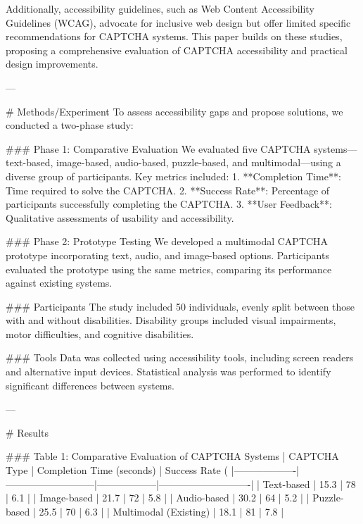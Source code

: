 Additionally, accessibility guidelines, such as Web Content Accessibility Guidelines (WCAG), advocate for inclusive web design but offer limited specific recommendations for CAPTCHA systems. This paper builds on these studies, proposing a comprehensive evaluation of CAPTCHA accessibility and practical design improvements.  

---

# Methods/Experiment  
To assess accessibility gaps and propose solutions, we conducted a two-phase study:  

### Phase 1: Comparative Evaluation  
We evaluated five CAPTCHA systems—text-based, image-based, audio-based, puzzle-based, and multimodal—using a diverse group of participants. Key metrics included:  
1. **Completion Time**: Time required to solve the CAPTCHA.  
2. **Success Rate**: Percentage of participants successfully completing the CAPTCHA.  
3. **User Feedback**: Qualitative assessments of usability and accessibility.  

### Phase 2: Prototype Testing  
We developed a multimodal CAPTCHA prototype incorporating text, audio, and image-based options. Participants evaluated the prototype using the same metrics, comparing its performance against existing systems.  

### Participants  
The study included 50 individuals, evenly split between those with and without disabilities. Disability groups included visual impairments, motor difficulties, and cognitive disabilities.  

### Tools  
Data was collected using accessibility tools, including screen readers and alternative input devices. Statistical analysis was performed to identify significant differences between systems.  

---

# Results  

### Table 1: Comparative Evaluation of CAPTCHA Systems  
| CAPTCHA Type      | Completion Time (seconds) | Success Rate (%
|-------------------|---------------------------|------------------|----------------------------|  
| Text-based        | 15.3                     | 78               | 6.1                        |  
| Image-based       | 21.7                     | 72               | 5.8                        |  
| Audio-based       | 30.2                     | 64               | 5.2                        |  
| Puzzle-based      | 25.5                     | 70               | 6.3                        |  
| Multimodal (Existing) | 18.1                  | 81               | 7.8                        |  

